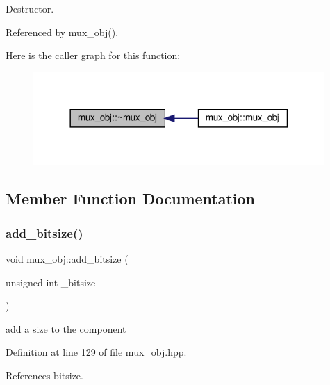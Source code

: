 Destructor. 



Referenced by mux\+\_\+obj().

Here is the caller graph for this function\+:
\nopagebreak
\begin{figure}[H]
\begin{center}
\leavevmode
\includegraphics[width=314pt]{d9/d65/classmux__obj_ab90330142a4aa1987568be56f12ede91_icgraph}
\end{center}
\end{figure}


\subsection{Member Function Documentation}
\mbox{\label{classmux__obj_a0cd258c5026332ced51880b39dfc0c9f}} 
\subsubsection{\texorpdfstring{add\+\_\+bitsize()}{add\_bitsize()}}
{\footnotesize\ttfamily void mux\+\_\+obj\+::add\+\_\+bitsize (\begin{DoxyParamCaption}\item[{unsigned int}]{\+\_\+bitsize }\end{DoxyParamCaption})\hspace{0.3cm}{\ttfamily [inline]}}



add a size to the component 



Definition at line 129 of file mux\+\_\+obj.\+hpp.



References bitsize.

\mbox{\label{classmux__obj_a0d84e65629a8f217e8b9afa8c1af3254}} 
